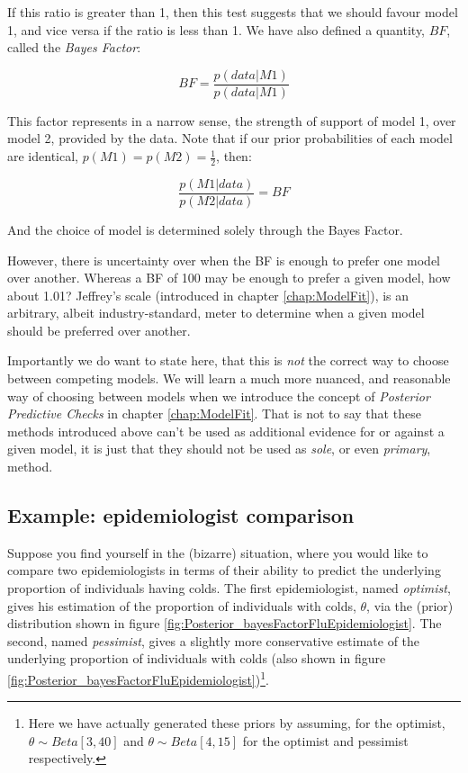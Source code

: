 \documentclass[11pt,fullpage]{book}
\begin{document}
If this ratio is greater than 1, then this test suggests that we should favour model 1, and vice versa if the ratio is less than 1. We have also defined a quantity, $BF$, called the \textit{Bayes Factor}:

\begin{equation}\label{eq:Posterior_bayesFactorDefinition}
BF = \frac{p(data|M1)}{p(data|M1)}
\end{equation}

This factor represents in a narrow sense, the strength of support of model 1, over model 2, provided by the data. Note that if our prior probabilities of each model are identical, $p(M1) = p(M2) = \frac{1}{2}$, then:

\begin{equation}
\frac{p(M1|data)}{p(M2|data)} = BF
\end{equation}

And the choice of model is determined solely through the Bayes Factor. 

However, there is uncertainty over when the BF is enough to prefer one model over another. Whereas a BF of 100 may be enough to prefer a given model, how about 1.01? Jeffrey's scale (introduced in chapter \ref{chap:ModelFit}), is an arbitrary, albeit industry-standard, meter to determine when a given model should be preferred over another.

Importantly we do want to state here, that this is \textit{not} the correct way to choose between competing models. We will learn a much more nuanced, and reasonable way of choosing between models when we introduce the concept of \textit{Posterior Predictive Checks} in chapter \ref{chap:ModelFit}. That is not to say that these methods introduced above can't be used as additional evidence for or against a given model, it is just that they should not be used as \textit{sole}, or even \textit{primary}, method.

\subsection{Example: epidemiologist comparison}
Suppose you find yourself in the (bizarre) situation, where you would like to compare two epidemiologists in terms of their ability to predict the underlying proportion of individuals having colds. The first epidemiologist, named \textit{optimist}, gives his estimation of the proportion of individuals with colds, $\theta$, via the (prior) distribution shown in figure \ref{fig:Posterior_bayesFactorFluEpidemiologist}. The second, named \textit{pessimist}, gives a slightly more conservative estimate of the underlying proportion of individuals with colds (also shown in figure \ref{fig:Posterior_bayesFactorFluEpidemiologist})\footnote{Here we have actually generated these priors by assuming, for the optimist, $\theta\sim Beta[3,40]$ and $\theta\sim Beta[4,15]$ for the optimist and pessimist respectively.}.
\end{document}
